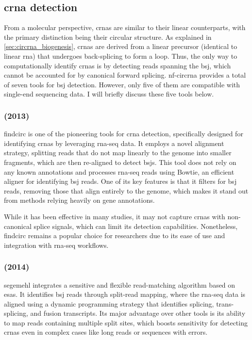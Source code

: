 \subsection{\gls{crna} detection}
\label{subsec:circrna_detection}
From a molecular perspective, \glspl{crna} are similar to their linear
counterparts, with the primary distinction being their circular structure.
As explained in \cref{sec:circrna_biogenesis}, \glspl{crna} are derived from a
linear precursor (identical to linear \gls{rna}) that undergoes back-splicing
to form a loop.
Thus, the only way to computationally identify \glspl{crna} is by detecting
reads spanning the \gls{bsj}, which cannot be accounted for by canonical
forward splicing.
\gls{nf-circrna} provides a total of seven tools for \gls{bsj}
detection.
However, only five of them are compatible with single-end sequencing data.
I will briefly discuss these five tools below.

\subsubsection{ (2013)}
\Gls{findcirc} is one of the pioneering tools for \gls{crna} detection,
specifically designed for identifying \glspl{crna} by leveraging \gls{rna-seq}
data.
It employs a novel alignment strategy, splitting reads that do not map linearly
to the genome into smaller fragments, which are then re-aligned to detect
\glspl{bsj}\supercite{memczak_circular_2013}.
This tool does not rely on any known annotations and processes \gls{rna-seq}
reads using Bowtie, an efficient aligner for identifying \gls{bsj} reads.
One of its key features is that it filters for \gls{bsj} reads, removing those
that align entirely to the genome, which makes it stand out from methods
relying heavily on gene annotations\supercite{memczak_circular_2013}.

While it has been effective in many studies, it may not capture \glspl{crna}
with non-canonical splice signals, which can limit its detection
capabilities\supercite{sekar_circular_2018,liu_prkra_2022}.
Nonetheless, \gls{findcirc} remains a popular choice for researchers due to its
ease of use and integration with \gls{rna-seq} workflows.

\subsubsection{ (2014)}
\Gls{segemehl} integrates a sensitive and flexible read-matching algorithm
based on \glspl{esa}.
It identifies \gls{bsj} reads through split-read mapping, where the
\gls{rna-seq} data is aligned using a dynamic programming strategy that
identifies splicing, trans-splicing, and fusion transcripts.
Its major advantage over other tools is its ability to map reads containing
multiple split sites, which boosts sensitivity for detecting \glspl{crna} even
in complex cases like long reads or sequences with
errors\supercite{hoffmann_multi-split_2014}.

